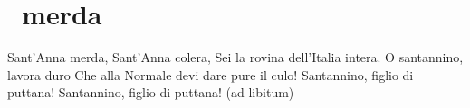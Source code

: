 \section{\santanna\ merda}
\begin{canzone}
Sant’Anna merda, Sant’Anna colera,
Sei la rovina dell’Italia intera.
O santannino, lavora duro
Che alla Normale devi dare pure il culo!
Santannino, figlio di puttana!
Santannino, figlio di puttana! 
(ad libitum)
\end{canzone}
